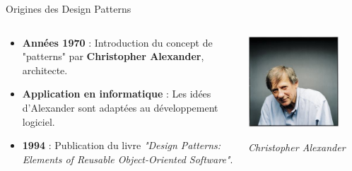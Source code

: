 \documentclass[aspectratio=169]{beamer}
\begin{document}
\begin{frame}{Origines des Design Patterns}
    \begin{columns}
        \begin{column}{0.6\textwidth}
            \begin{itemize}
                \item \textbf{Années 1970} : Introduction du concept de "patterns" par \textbf{Christopher Alexander}, architecte.
                \item \textbf{Application en informatique} : Les idées d'Alexander sont adaptées au développement logiciel.
                \item \textbf{1994} : Publication du livre \textit{"Design Patterns: Elements of Reusable Object-Oriented Software"}.
            \end{itemize}
        \end{column}
        \begin{column}{0.4\textwidth}
            \includegraphics[width=0.8\textwidth]{pic/christopher_alexander.jpg}
            \begin{center}
                \small{\textit{Christopher Alexander}}
            \end{center}
        \end{column}
    \end{columns}
\end{frame}
\end{document}
